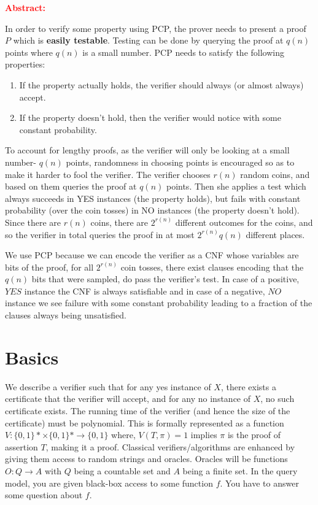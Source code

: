 \textcolor{red}{\textbf{Abstract:} }

In order to verify some property using PCP, the prover needs to present a proof $P$ which is \textbf{easily testable}. Testing can be done by querying the proof at $q(n)$ points where $q(n)$ is a small number. PCP needs to satisfy the following properties: 
\begin{enumerate}[nolistsep]
    \item If the property actually holds, the verifier should always (or almost always) accept.
    \item If the property doesn't hold, then the verifier would notice with some constant probability.
\end{enumerate}

To account for lengthy proofs, as the verifier will only be looking at a small number- $q(n)$ points, randomness in choosing points is encouraged so as to make it harder to fool the verifier. The verifier chooses $r(n)$ random coins, and based on them queries the proof at $q(n)$ points. Then she applies a test which always succeeds in YES instances (the property holds), but fails with constant probability (over the coin tosses) in NO instances (the property doesn't hold). Since there are $r(n)$ coins, there are $2^{r(n)}$ different outcomes for the coins, and so the verifier in total queries the proof in at most $2^{r(n)}q(n)$ different places.

We use PCP because we can encode the verifier as a CNF whose variables are bits of the proof, for all $2^{r(n)}$ coin tosses, there exist clauses encoding that the $q(n)$ bits that were sampled, do pass the verifier's test. In case of a positive, $YES$ instance the CNF is always satisfiable and in case of a negative, $NO$ instance we see failure with some constant probability leading to a fraction of the clauses always being unsatisfied. 

\section{Basics}
We describe a verifier such that for any yes instance of $X$, there exists a certificate that the verifier will accept, and for any no instance of $X$, no such certificate exists. The running time of the verifier (and hence the size of the certificate) must be polynomial. This is formally represented as a function $V: \{0,1\}* \times \{0,1\}* \rightarrow \{0,1\}$ where, $V(T,\pi) = 1$ implies $\pi$ is the proof of assertion $T$, making it a proof. Classical verifiers/algorithms are enhanced by giving them access to random strings and oracles. Oracles will be functions $O: Q \rightarrow A$ with $Q$ being a countable set and $A$ being a finite set. In the query model, you are given
black-box access to some function $f$. You have to answer some question about $f$. 

